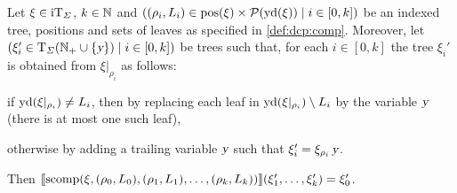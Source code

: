 \documentclass[../../document.tex]{subfiles}
\begin{document}
    \begin{lemma}
        Let \(\xi \in \operatorname{iT}_{\varSigma}\), \(k \in \mathbb{N}\) and \(((\rho_i, L_i) \in \operatorname{pos}(\xi) \times \mathcal{P}(\operatorname{yd}({\xi})) \mid i \in [0,k])\) be an indexed tree, positions and sets of leaves as specified in \cref{def:dcp:comp}.
        Moreover, let \((\xi_i' \in \operatorname{T}_\varSigma(\mathbb{N}_+ \cup \{\textsl{y}\}) \mid i \in [0,k])\) be trees such that, for each \(i \in [0,k]\) the tree \(\xi_i'\) is obtained from \(\xi|_{\rho_i}\) as follows:
        \begin{compactitem}
            \item if \(\operatorname{yd}(\xi|_{\rho_i}) \neq L_i\), then by replacing each leaf in \(\operatorname{yd}(\xi|_{\rho_i}) \setminus L_i\) by the variable \(\textsl{y}\) (there is at most one such leaf),
            \item otherwise by adding a trailing variable \(\textsl{y}\) such that \(\xi_i' = \xi_{\rho_i}\,\textsl{y}\).
        \end{compactitem}
        
        Then \(\llbracket\mathrm{scomp}(\xi, (\rho_0, L_0), (\rho_1, L_1), \ldots, (\rho_k, L_k))\rrbracket(\xi_1', \ldots, \xi_k') = \xi_0'\).
    \end{lemma}
\end{document}
